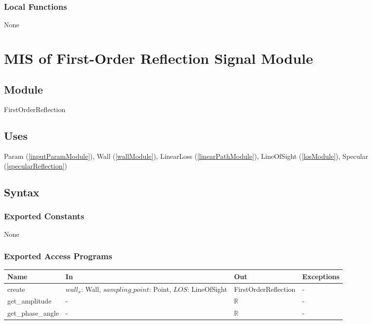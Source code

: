 \documentclass[12pt, titlepage]{article}
\begin{document}
\subsubsection{Local Functions}
None



\newpage
\section{MIS of First-Order Reflection Signal Module} \label{forsModule}

\subsection{Module}

FirstOrderReflection

\subsection{Uses}
Param (\autoref{inputParamModule}), Wall (\autoref{wallModule}), LinearLoss (\autoref{linearPathModule}), LineOfSight (\autoref{losModule}), Specular (\autoref{specularReflection})

\subsection{Syntax}

\subsubsection{Exported Constants} None

\subsubsection{Exported Access Programs}

\begin{center}
\begin{tabular}{p{3cm} p{3cm} p{4cm} p{2cm}}
\hline
\textbf{Name} & \textbf{In} & \textbf{Out} & \textbf{Exceptions} \\
\hline
create & $wall_x$: Wall, $sampling\_point$: Point, $LOS$: LineOfSight & FirstOrderReflection & - \\
get\_amplitude & - & $\mathbb{R}$ & - \\
get\_phase\_angle & - & $\mathbb{R}$ & - \\

\hline
\end{tabular}
\end{center}
\end{document}
